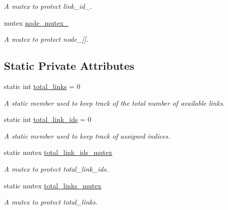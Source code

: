 \begin{DoxyCompactItemize}
\begin{DoxyCompactList}\small\item\em A mutex to protect link\+\_\+id\+\_\+. \end{DoxyCompactList}\item 
mutex \hyperlink{classLink_a7c189d9284b91a7379f25b387d9fb50e}{node\+\_\+mutex\+\_\+}\hypertarget{classLink_a7c189d9284b91a7379f25b387d9fb50e}{}\label{classLink_a7c189d9284b91a7379f25b387d9fb50e}

\begin{DoxyCompactList}\small\item\em A mutex to protect node\+\_\+\mbox{[}\mbox{]}. \end{DoxyCompactList}\end{DoxyCompactItemize}
\subsection*{Static Private Attributes}
\begin{DoxyCompactItemize}
\item 
static int \hyperlink{classLink_ad240a01b7643e780f7472bf5058f2151}{total\+\_\+links} = 0
\begin{DoxyCompactList}\small\item\em A static member used to keep track of the total number of available links. \end{DoxyCompactList}\item 
static int \hyperlink{classLink_a28f2c40cb63fc1e3538ecbc570061a27}{total\+\_\+link\+\_\+ids} = 0\hypertarget{classLink_a28f2c40cb63fc1e3538ecbc570061a27}{}\label{classLink_a28f2c40cb63fc1e3538ecbc570061a27}

\begin{DoxyCompactList}\small\item\em A static member used to keep track of assigned indices. \end{DoxyCompactList}\item 
static mutex \hyperlink{classLink_a23dd72433e72dd42719265fd4c7fdaf7}{total\+\_\+link\+\_\+ids\+\_\+mutex}\hypertarget{classLink_a23dd72433e72dd42719265fd4c7fdaf7}{}\label{classLink_a23dd72433e72dd42719265fd4c7fdaf7}

\begin{DoxyCompactList}\small\item\em A mutex to protect total\+\_\+link\+\_\+ids. \end{DoxyCompactList}\item 
static mutex \hyperlink{classLink_aad684c92f53d65468d758a3ae6b9eaa1}{total\+\_\+links\+\_\+mutex}\hypertarget{classLink_aad684c92f53d65468d758a3ae6b9eaa1}{}\label{classLink_aad684c92f53d65468d758a3ae6b9eaa1}

\begin{DoxyCompactList}\small\item\em A mutex to protect total\+\_\+links. \end{DoxyCompactList}\end{DoxyCompactItemize}


